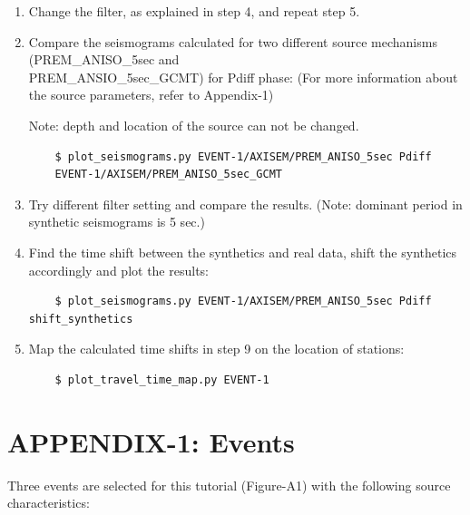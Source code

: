 \documentclass{article}
\begin{document}
\begin{enumerate}
    \item Change the filter, as explained in step 4, and repeat step 5.
    
    \item Compare the seismograms calculated for two different source mechanisms
    (PREM\_ANISO\_5sec and \\ PREM\_ANSIO\_5sec\_GCMT) for Pdiff phase: (For more
    information about the source parameters, refer to Appendix-1)
    
    Note: depth and location of the source can not be changed.
    \begin{verbatim}
    $ plot_seismograms.py EVENT-1/AXISEM/PREM_ANISO_5sec Pdiff 
    EVENT-1/AXISEM/PREM_ANISO_5sec_GCMT
    \end{verbatim}
    
    \item Try different filter setting and compare the results.
    (Note: dominant period in synthetic seismograms is 5 sec.)
    
    \item Find the time shift between the synthetics and real data, shift the synthetics
    accordingly and plot the results:
    
    \begin{verbatim}
    $ plot_seismograms.py EVENT-1/AXISEM/PREM_ANISO_5sec Pdiff shift_synthetics
    \end{verbatim}
    
    \item Map the calculated time shifts in step 9 on the location of stations:
    
    \begin{verbatim}
    $ plot_travel_time_map.py EVENT-1
    \end{verbatim}

\end{enumerate}

\newpage
\appendix
\section{APPENDIX-1: Events}

Three events are selected for this tutorial (Figure-A1) with the following source 
characteristics:
\end{document}
